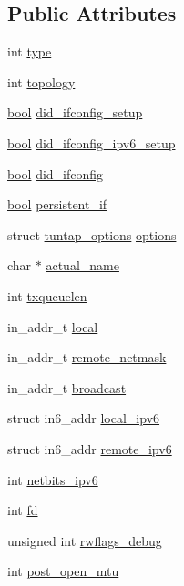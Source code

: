 \subsection*{Public Attributes}
\begin{DoxyCompactItemize}
\item 
int \hyperlink{structtuntap_a33cc194495f4f5cac85cd788defc2350}{type}
\item 
int \hyperlink{structtuntap_a8fcc61d0d87cd8df310942042be86f23}{topology}
\item 
\hyperlink{automatic_8c_abb452686968e48b67397da5f97445f5b}{bool} \hyperlink{structtuntap_a8d99c6cfbc9fdf2c1466535afeebdbdb}{did\+\_\+ifconfig\+\_\+setup}
\item 
\hyperlink{automatic_8c_abb452686968e48b67397da5f97445f5b}{bool} \hyperlink{structtuntap_a70831f0f929eb68a2c0cdd85dc8c917c}{did\+\_\+ifconfig\+\_\+ipv6\+\_\+setup}
\item 
\hyperlink{automatic_8c_abb452686968e48b67397da5f97445f5b}{bool} \hyperlink{structtuntap_a9f6502124af50012c9e9b19089590d27}{did\+\_\+ifconfig}
\item 
\hyperlink{automatic_8c_abb452686968e48b67397da5f97445f5b}{bool} \hyperlink{structtuntap_afd4a0397ced0c1118162c669228dfc58}{persistent\+\_\+if}
\item 
struct \hyperlink{structtuntap__options}{tuntap\+\_\+options} \hyperlink{structtuntap_a7efedc501b62607f297aeee8b839c7c8}{options}
\item 
char $\ast$ \hyperlink{structtuntap_acfb3d1fb2ebdae626785a31156ec8bce}{actual\+\_\+name}
\item 
int \hyperlink{structtuntap_aa20e943f0981bec0e544b6c8dc5ee4bb}{txqueuelen}
\item 
in\+\_\+addr\+\_\+t \hyperlink{structtuntap_a310bbe962b4610e99c122fc7147bfbd4}{local}
\item 
in\+\_\+addr\+\_\+t \hyperlink{structtuntap_adfc8cf984637bed412c9718cd8a4b0cb}{remote\+\_\+netmask}
\item 
in\+\_\+addr\+\_\+t \hyperlink{structtuntap_a167d8c3651caeb0189d9f3bdf4fc4b89}{broadcast}
\item 
struct in6\+\_\+addr \hyperlink{structtuntap_ab854704d9efd886f25b7a0083b0196c6}{local\+\_\+ipv6}
\item 
struct in6\+\_\+addr \hyperlink{structtuntap_a81746b4bf6278227195affed161a12c5}{remote\+\_\+ipv6}
\item 
int \hyperlink{structtuntap_a481a2d64b9173bd16b80d758c478dfef}{netbits\+\_\+ipv6}
\item 
int \hyperlink{structtuntap_a38643d31d3dda496f36d9036fb8285d2}{fd}
\item 
unsigned int \hyperlink{structtuntap_a00ce662769a347aadc467000312a51c9}{rwflags\+\_\+debug}
\item 
int \hyperlink{structtuntap_ade6ab1d7cbe4e6f64dc453eaf7fc251e}{post\+\_\+open\+\_\+mtu}
\end{DoxyCompactItemize}


